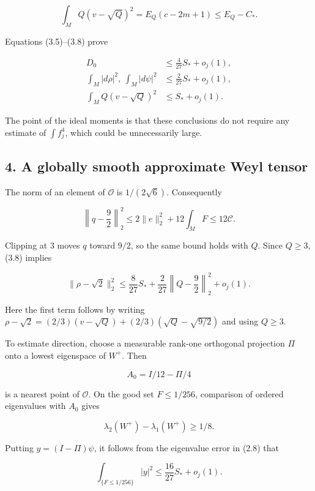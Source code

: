 \documentclass[
  11pt,
]{article}
\begin{document}
\[
 \int_M Q(v-\sqrt Q)^2=E_Q(c-2m+1)\le E_Q-C_*.
 \tag{3.8}
\]

Equations (3.5)--(3.8) prove

\[
 \begin{split}
 D_0&\le\frac4{27}S_*+o_j(1),\\
 \int_M|d\rho|^2,\ \int_M|d\psi|^2
     &\le\frac2{27}S_*+o_j(1),\\
 \int_MQ(v-\sqrt Q)^2&\le S_*+o_j(1).
 \end{split}                                              \tag{3.9}
\]

The point of the ideal moments is that these conclusions do not require
any estimate of \(\int f_j^4\), which could be unnecessarily large.

\hypertarget{a-globally-smooth-approximate-weyl-tensor}{%
\subsection{4. A globally smooth approximate Weyl
tensor}\label{a-globally-smooth-approximate-weyl-tensor}}

The norm of an element of \(\mathcal O\) is \(1/(2\sqrt6)\).
Consequently

\[
 \left\|q-\frac92\right\|_2^2
       \le2\|e\|_2^2+12\int_MF\le12\mathcal C.           \tag{4.1}
\]

Clipping at \(3\) moves \(q\) toward \(9/2\), so the same bound holds
with \(Q\). Since \(Q\ge3\), (3.8) implies

\[
 \|\rho-\sqrt2\|_2^2
  \le\frac8{27}S_*+\frac2{27}\left\|Q-\frac92\right\|_2^2+o_j(1).
 \tag{4.2}
\]

Here the first term follows by writing
\(\rho-\sqrt2=(2/3)(v-\sqrt Q)+(2/3)(\sqrt Q-\sqrt{9/2})\) and using
\(Q\ge3\).

To estimate direction, choose a measurable rank-one orthogonal
projection \(\Pi\) onto a lowest eigenspace of \(W^+\). Then

\[
                  A_0=I/12-\Pi/4
\]

is a nearest point of \(\mathcal O\). On the good set \(F\le1/256\),
comparison of ordered eigenvalues with \(A_0\) gives

\[
                   \lambda_2(W^+)-\lambda_1(W^+)\ge1/8.
\]

Putting \(y=(I-\Pi)\psi\), it follows from the eigenvalue error in (2.8)
that

\[
 \int_{\{F\le1/256\}}|y|^2\le\frac{16}{27}S_*+o_j(1).
\]
\end{document}
